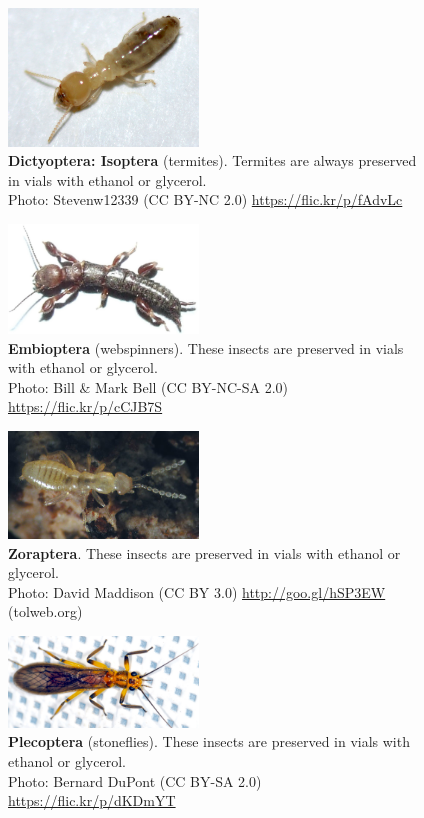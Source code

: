 \documentclass[letterpaper, 11pt]{article}
\begin{document}
\begin{figure}
  \caption{\textbf{Dictyoptera: Isoptera} (termites). Termites are always preserved in vials with ethanol or glycerol. \\ Photo: Stevenw12339 (CC BY-NC 2.0) \url{https://flic.kr/p/fAdvLc}}
  \includegraphics[width=0.45\textwidth]{BlattodeaIsoptera}
\end{figure}

\clearpage

\begin{figure}
  \caption{\textbf{Embioptera} (webspinners). These insects are preserved in vials with ethanol or glycerol.\\ Photo: Bill \& Mark Bell (CC BY-NC-SA 2.0) \url{https://flic.kr/p/cCJB7S}}
  \includegraphics[width=0.45\textwidth]{Embioptera}
\end{figure}

\begin{figure}
  \caption{\textbf{Zoraptera}. These insects are preserved in vials with ethanol or glycerol. \\ Photo: David Maddison (CC BY 3.0) \url{http://goo.gl/hSP3EW} (tolweb.org)}
  \includegraphics[width=0.45\textwidth]{Zoraptera}
\end{figure}

\begin{figure}
  \caption{\textbf{Plecoptera} (stoneflies). These insects are preserved in vials with ethanol or glycerol.\\ Photo: Bernard DuPont (CC BY-SA 2.0) \url{https://flic.kr/p/dKDmYT}}
  \includegraphics[width=0.45\textwidth]{Plecoptera}
\end{figure}
\end{document}
